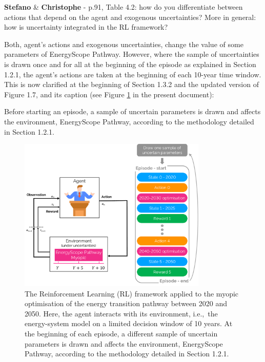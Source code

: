 \documentclass[12pt,a4paper]{article}
\def\ie{i.e.,\ }
\begin{document}
\begin{mdframed}[style=comment] %
{\color{orange} \textbf{Stefano}} \& {\color{violet} \textbf{Christophe}} - p.91, Table 4.2: how do you differentiate between actions that depend on the agent and exogenous uncertainties? More in general: how is uncertainty integrated in the RL framework?
\end{mdframed}

\noindent Both, agent's actions and exogenous uncertainties, change the value of some parameters of EnergyScope Pathway. However, where the sample of uncertainties is drawn once and for all at the beginning of the episode as explained in Section 1.2.1, the agent's actions are taken at the beginning of each 10-year time window. This is now clarified {\color{blue}at the beginning of Section 1.3.2 and the updated version of Figure 1.7, and its caption} (see Figure \ref{fig:Schematics_RL} in the present document):

\begin{mdframed}[style=manuscript] %
Before starting an episode, a sample of uncertain parameters is drawn and affects the environment, EnergyScope Pathway, according to the methodology detailed in Section 1.2.1. 
\end{mdframed}

\begin{figure}[!htbp]
\centering
\includegraphics[width=0.8\textwidth]{Schematics_RL.pdf}
\caption{The Reinforcement Learning (RL) framework applied to the myopic optimisation of the energy transition pathway between 2020 and 2050. Here, the agent interacts with its environment, \ie the energy-system model on a limited decision window of 10 years. At the beginning of each episode, a different sample of uncertain parameters is drawn and affects the environment, EnergyScope Pathway, according to the methodology detailed in Section 1.2.1.}
\label{fig:Schematics_RL}
\end{figure}
\end{document}
